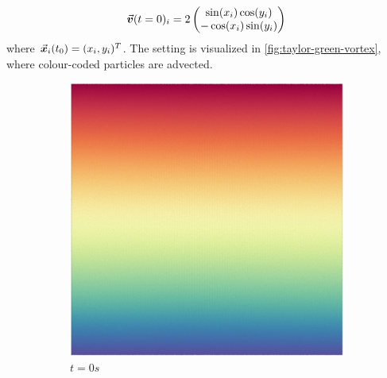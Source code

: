 \begin{equation}
  \vec{\bm{v}}(t=0)_i = 2\begin{pmatrix}
    \sin(x_i) \cos(y_i) \\
    -\cos(x_i) \sin(y_i)
  \end{pmatrix}
\end{equation}
where $\vec{\bm{x}}_i(t_0) = (x_i, y_i)^T$. The setting is visualized in \autoref{fig:taylor-green-vortex}, where colour-coded particles are advected.

\begin{figure}
  \centering
  \begin{subfigure}[t]{0.4\textwidth}
    \includegraphics[width=\textwidth]{images/density/taylorgreen_t0.jpg}
    \caption{$t=0s$}
  \end{subfigure}
  \begin{subfigure}[t]{0.4\textwidth}

\end{subfigure}
\end{figure}
